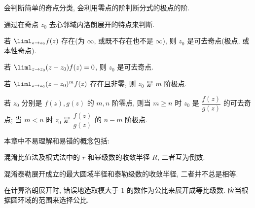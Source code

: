 \begin{conclusion}
\begin{conclusion}
  \end{conclusion}
  \item 会判断简单的奇点分类, 会利用零点的阶判断分式的极点的阶.
  \begin{conclusion}
    \item 通过在奇点 $z_0$ 去心邻域内洛朗展开的特点来判断.
    \item 若 $\liml_{z\ra z_0} f(z)$ 存在(为 $\infty$, 或既不存在也不是 $\infty$), 则 $z_0$ 是可去奇点(极点, 或本性奇点).
    \item 若 $\liml_{z\ra z_0} (z-z_0)f(z)=0$, 则 $z_0$ 是可去奇点.
    \item 若 $\liml_{z\ra z_0} (z-z_0)^mf(z)$ 存在且非零, 则 $z_0$ 是 $m$ 阶极点.
    \item 若 $z_0$ 分别是 $f(z),g(z)$ 的 $m,n$ 阶零点, 则当 $m\ge n$ 时 $z_0$ 是 $\dfrac{f(z)}{g(z)}$ 的可去奇点; 当 $m<n$ 时 $z_0$ 是 $\dfrac{f(z)}{g(z)}$ 的 $n-m$ 阶极点.
  \end{conclusion}
\end{conclusion}

本章中不易理解和易错的概念包括:
\begin{enuma}
  \item 混淆比值法及根式法中的 $r$ 和幂级数的收敛半径 $R$, 二者互为倒数.
  \item 混淆泰勒展开成立的最大圆域半径和泰勒级数的收敛半径, 二者并不总是相等.
  \item 在计算洛朗展开时, 错误地选取模大于 $1$ 的数作为公比来展开成等比级数. 应当根据圆环域的范围来选择公比.
\end{enuma}




